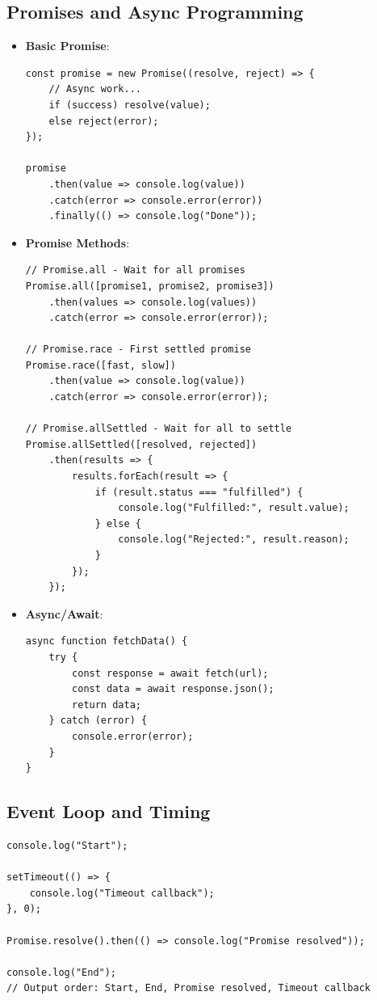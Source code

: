 \documentclass{article}
\begin{document}
\subsection{Promises and Async Programming}
\begin{itemize}
    \item \textbf{Basic Promise}:
    \begin{lstlisting}
const promise = new Promise((resolve, reject) => {
    // Async work...
    if (success) resolve(value);
    else reject(error);
});

promise
    .then(value => console.log(value))
    .catch(error => console.error(error))
    .finally(() => console.log("Done"));
    \end{lstlisting}
    
    \item \textbf{Promise Methods}:
    \begin{lstlisting}
// Promise.all - Wait for all promises
Promise.all([promise1, promise2, promise3])
    .then(values => console.log(values))
    .catch(error => console.error(error));

// Promise.race - First settled promise
Promise.race([fast, slow])
    .then(value => console.log(value))
    .catch(error => console.error(error));

// Promise.allSettled - Wait for all to settle
Promise.allSettled([resolved, rejected])
    .then(results => {
        results.forEach(result => {
            if (result.status === "fulfilled") {
                console.log("Fulfilled:", result.value);
            } else {
                console.log("Rejected:", result.reason);
            }
        });
    });
    \end{lstlisting}
    
    \item \textbf{Async/Await}:
    \begin{lstlisting}
async function fetchData() {
    try {
        const response = await fetch(url);
        const data = await response.json();
        return data;
    } catch (error) {
        console.error(error);
    }
}
    \end{lstlisting}
\end{itemize}

\subsection{Event Loop and Timing}
\begin{lstlisting}
console.log("Start");

setTimeout(() => {
    console.log("Timeout callback");
}, 0);

Promise.resolve().then(() => console.log("Promise resolved"));

console.log("End");
// Output order: Start, End, Promise resolved, Timeout callback
\end{lstlisting}
\end{document}
